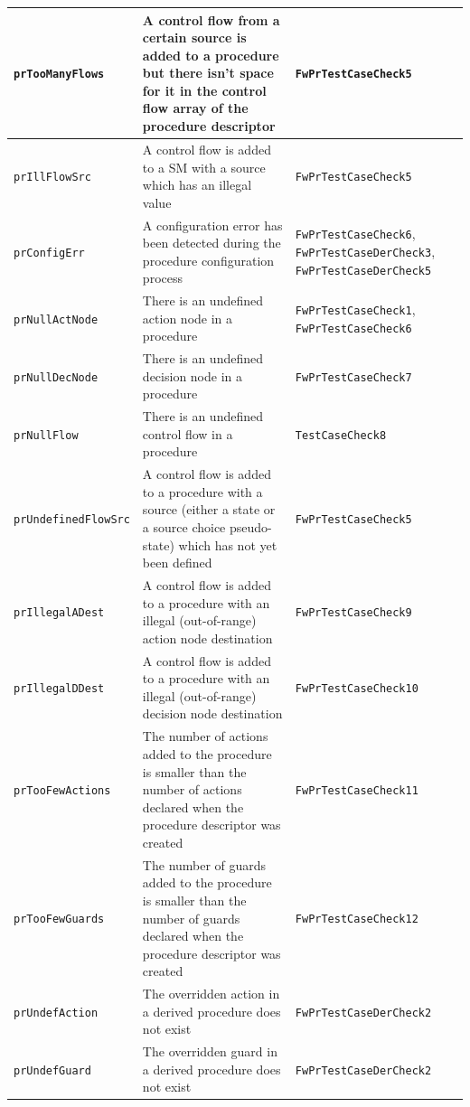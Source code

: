 \documentclass[a4paper,10pt]{article}
\begin{document}
\begin{longtable}{|p{3cm}|p{3.7cm}|p{4.5cm}|}
\hline
\texttt{prTooManyFlows} & A control flow from a certain source is added to a procedure but there isn't space for it in the control flow array of the
procedure descriptor & \texttt{FwPrTestCaseCheck5} \\
\hline
\texttt{prIllFlowSrc} & A control flow is added to a SM with a source which has an illegal value & \texttt{FwPrTestCaseCheck5} \\
\hline
\texttt{prConfigErr} & A configuration error has been detected during the procedure configuration process & \texttt{FwPrTestCaseCheck6}, \texttt{FwPrTestCaseDerCheck3}, \texttt{FwPrTestCaseDerCheck5} \\
\hline
\texttt{prNullActNode} & There is an undefined action node in a procedure & \texttt{FwPrTestCaseCheck1}, \texttt{FwPrTestCaseCheck6} \\
\hline
\texttt{prNullDecNode} & There is an undefined decision node in a procedure & \texttt{FwPrTestCaseCheck7} \\
\hline
\texttt{prNullFlow} & There is an undefined control flow in a procedure & \texttt{TestCaseCheck8} \\
\hline
\texttt{prUndefinedFlowSrc} & A control flow is added to a procedure with a source (either a state or a source choice pseudo-state) which has not yet been defined & \texttt{FwPrTestCaseCheck5} \\
\hline
\texttt{prIllegalADest} & A control flow is added to a procedure with an illegal (out-of-range) action node destination & \texttt{FwPrTestCaseCheck9} \\
\hline
\texttt{prIllegalDDest} & A control flow is added to a procedure with an illegal (out-of-range) decision node destination 
& \texttt{FwPrTestCaseCheck10} \\
\hline
\texttt{prTooFewActions} & The number of actions added to the procedure is smaller than the number of actions declared when the procedure descriptor was created 
& \texttt{FwPrTestCaseCheck11} \\
\hline
\texttt{prTooFewGuards} & The number of guards added to the procedure is smaller than the number of guards declared when the procedure descriptor was created 
& \texttt{FwPrTestCaseCheck12} \\
\hline
\texttt{prUndefAction} & The overridden action in a derived procedure does not exist 
& \texttt{FwPrTestCaseDerCheck2} \\
\hline
\texttt{prUndefGuard} & The overridden guard in a derived procedure does not exist
& \texttt{FwPrTestCaseDerCheck2} \\

\end{longtable}
\end{document}
